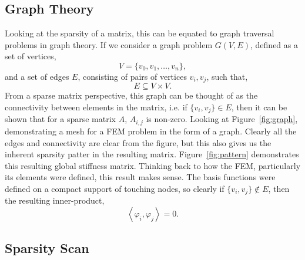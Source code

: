 \subsection{Graph Theory}

Looking at the sparsity of a matrix, this can be equated to graph traversal problems in graph theory. If we consider a graph problem $G(V,E)$, defined as a set of vertices,
\begin{equation}
	V = \{v_0,v_1,\dots,v_n\},
\end{equation}
and a set of edges $E$, consisting of pairs of vertices $v_i,v_j$, such that,
\begin{equation}
	E \subseteq V\times V.
\end{equation}
From a sparse matrix perspective, this graph can be thought of as the connectivity between elements in the matrix, i.e. if $\{v_i,v_j\} \in E$, then it can be shown that for a sparse matrix $A$, $A_{i,j}$ is non-zero. Looking at Figure~\ref{fig:graph}, demonstrating a mesh for a FEM problem in the form of a graph. Clearly all the edges and connectivity are clear from the figure, but this also gives us the inherent sparsity patter in the resulting matrix. Figure~\ref{fig:pattern} demonstrates this resulting global stiffness matrix. Thinking back to how the FEM, particularly its elements were defined, this result makes sense. The basis functions were defined on a compact support of touching nodes, so clearly if $\{v_i,v_j\} \notin E$, then the resulting inner-product,
\begin{equation}
	\left\langle \varphi_i, \varphi_j \right\rangle = 0.
\end{equation}

\subsection{Sparsity Scan}\label{sparsity}

